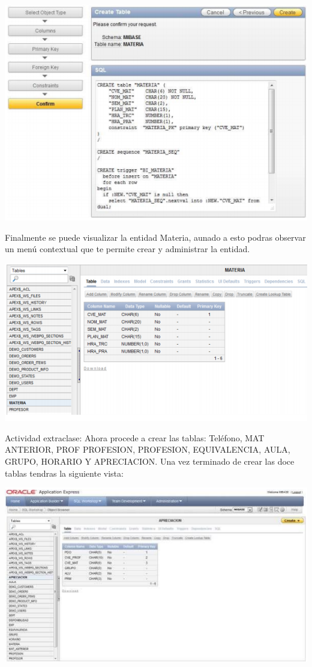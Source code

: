 \documentclass[12pt,letterpaper]{article}
\begin{document}
\begin{center}
\includegraphics[width=15cm]{./IMG/img20}
\end{center}
Finalmente se puede visualizar la entidad Materia, aunado a esto podras observar
un men\'u contextual que te permite crear y administrar la entidad. 
\begin{center}
\includegraphics[width=15cm]{./IMG/img21}
\end{center}

Actividad extraclase: Ahora procede a crear las tablas: Tel\'efono,
MAT ANTERIOR, PROF PROFESION, PROFESION, EQUIVALENCIA, AULA,
GRUPO, HORARIO Y APRECIACION. Una vez terminado de crear las doce
tablas tendras la siguiente vista: 

\begin{center}
\includegraphics[width=15cm]{./IMG/img22}
\end{center}
\end{document}
